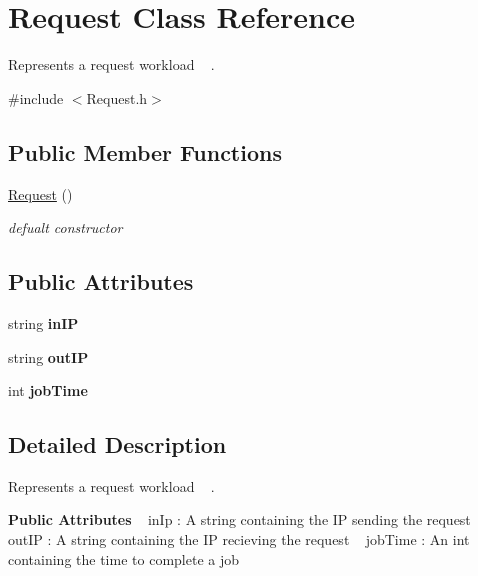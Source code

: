 \hypertarget{classRequest}{}\section{Request Class Reference}
\label{classRequest}


Represents a request workload ~\newline
.  




{\ttfamily \#include $<$Request.\+h$>$}

\subsection*{Public Member Functions}
\begin{DoxyCompactItemize}
\item 
\hyperlink{classRequest_afaf8d8928de7ffff8a3767589489bd33}{Request} ()
\begin{DoxyCompactList}\small\item\em defualt constructor \end{DoxyCompactList}\end{DoxyCompactItemize}
\subsection*{Public Attributes}
\begin{DoxyCompactItemize}
\item 
\mbox{\label{classRequest_ae392c6c23536abdb45784e31112458ac}} 
string {\bfseries in\+IP}
\item 
\mbox{\label{classRequest_ad7c456a510bf588b92a17ede4ae9ff73}} 
string {\bfseries out\+IP}
\item 
\mbox{\label{classRequest_a24731bb1eaf05b3115336191a71d99ae}} 
int {\bfseries job\+Time}
\end{DoxyCompactItemize}


\subsection{Detailed Description}
Represents a request workload ~\newline
. 

{\bfseries Public Attributes} ~\newline
in\+Ip \+: A string containing the IP sending the request ~\newline
 out\+IP \+: A string containing the IP recieving the request ~\newline
 job\+Time \+: An int containing the time to complete a job ~\newline


